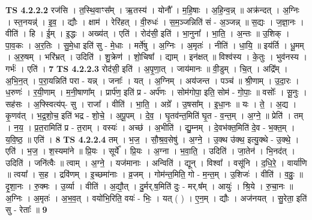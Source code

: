 \documentclass[17pt]{extarticle}
\begin{document}
                  \newline
                                \textbf{ TS 4.2.2.2} \newline
                  रज॑सि । त॒स्थि॒वाꣳस᳚म् । ऋ॒तस्य॑ । योनौ᳚ । म॒हि॒षाः । अ॒हि॒न्व॒न्न् ॥ अक्र॑न्दत् । अ॒ग्निः । स्त॒नयन्न्॑ । इ॒व॒ । द्यौः । क्षाम॑ । रेरि॑हत् । वी॒रुधः॑ । स॒म॒ञ्जन्निति॑ सं - अ॒ञ्जन्न् ॥ स॒द्यः । ज॒ज्ञा॒नः । वीति॑ । हि । ई॒म् । इ॒द्धः । अख्य॑त् । एति॑ । रोद॑सी॒ इति॑ । भा॒नुना᳚ । भा॒ति॒ । अ॒न्तः ॥ उ॒शिक् । पा॒व॒कः । अ॒र॒तिः । सु॒मे॒धा इति॑ सु - मे॒धाः । मर्ते॑षु । अ॒ग्निः । अ॒मृतः॑ । नीति॑ । धा॒यि॒ ॥ इय॑र्ति । धू॒मम् । अ॒रु॒षम् । भरि॑भ्रत् । उदिति॑ । शु॒क्रेण॑ । शो॒चिषा᳚ । द्याम् । इन॑क्षत् ॥ विश्व॑स्य । के॒तुः । भुव॑नस्य । गर्भः॑ । एति॑ । \textbf{  7} \newline
                  \newline
                                \textbf{ TS 4.2.2.3} \newline
                  रोद॑सी॒ इति॑ । अ॒पृ॒णा॒त् । जाय॑मानः ॥ वी॒डुम् । चि॒त् । अद्रि᳚म् । अ॒भि॒न॒त् । प॒रा॒यन्निति॑ परा - यन्न् । जनाः᳚ । यत् । अ॒ग्निम् । अय॑जन्त । पञ्च॑ ॥ श्री॒णाम् । उ॒दा॒रः । ध॒रुणः॑ । र॒यी॒णाम् । म॒नी॒षाणा᳚म् । प्रार्प॑ण॒ इति॑ प्र - अर्प॑णः । सोम॑गोपा॒ इति॒ सोम॑ - गो॒पाः॒ ॥ वसोः᳚ । सू॒नुः । सह॑सः । अ॒फ्स्वित्य॑प्- सु । राजा᳚ । वीति॑ । भा॒ति॒ । अग्रे᳚ । उ॒षसा᳚म् । इ॒धा॒नः ॥ यः । ते॒ । अ॒द्य । कृ॒णव॑त् । भ॒द्र॒शो॒च॒ इति॑ भद्र - शो॒चे॒ । अ॒पू॒पम् । दे॒व॒ । घृ॒तव॑न्त॒मिति॑ घृ॒त - व॒न्त॒म् । अ॒ग्ने॒ ॥ प्रेति॑ । तम् । न॒य॒ । प्र॒त॒रामिति॑ प्र - त॒राम् । वस्यः॑ । अच्छ॑ । अ॒भीति॑ । द्यु॒म्नम् । दे॒वभ॑क्त॒मिति॑ दे॒व - भ॒क्त॒म् । य॒वि॒ष्ठ॒ ॥ एति॑ । \textbf{  8} \newline
                  \newline
                                \textbf{ TS 4.2.2.4} \newline
                  तम् । भ॒ज॒ । सौ॒श्र॒व॒सेषु॑ । अ॒ग्ने॒ । उ॒क्थ उ॑क्थ॒ इत्यु॒क्थे - उ॒क्थे॒ । एति॑ । भ॒ज॒ । श॒स्यमा॑ने ॥ प्रि॒यः । सूर्ये᳚ । प्रि॒यः । अ॒ग्ना । भ॒वा॒ति॒ । उदिति॑ । जा॒तेन॑ । भि॒नद॑त् । उदिति॑ । जनि॑त्वैः ॥ त्वाम् । अ॒ग्ने॒ । यज॑मानाः । अन्विति॑ । द्यून् । विश्वा᳚ । वसू॑नि । द॒धि॒रे॒ । वार्या॑णि ॥ त्वया᳚ । स॒ह । द्रवि॑णम् । इ॒च्छमा॑नाः । व्र॒जम् । गोम॑न्त॒मिति॒ गो - म॒न्त॒म् । उ॒शिजः॑ । वीति॑ । व॒व्रुः॒ ॥ दृ॒शा॒नः । रु॒क्मः । उ॒र्व्या । वीति॑ । अ॒द्यौ॒त् । दु॒र्मर्.ष॒मिति॑ दुः - मर्.ष᳚म् । आयुः॑ । श्रि॒ये । रु॒चा॒नः ॥ अ॒ग्निः । अ॒मृतः॑ । अ॒भ॒व॒त् । वयो॑भि॒रिति॒ वयः॑ - भिः॒ । यत् ( ) । ए॒न॒म् । द्यौः । अज॑नयत् । सु॒रेता॒ इति॑ सु - रेताः᳚ ॥ \textbf{  9} \newline
                  \newline
\end{document}
